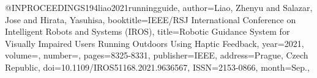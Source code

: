 @INPROCEEDINGS{194liao2021runningguide,
author={Liao, Zhenyu and Salazar, Jose and Hirata, Yasuhisa},
booktitle={IEEE/RSJ International Conference on Intelligent Robots and Systems (IROS)}, 
title={Robotic Guidance System for Visually Impaired Users Running Outdoors Using Haptic Feedback}, 
year={2021},
volume={},
number={},
pages={8325-8331},
publisher={IEEE},
address={Prague, Czech Republic},
doi={10.1109/IROS51168.2021.9636567},
ISSN={2153-0866},
month={Sep.},}